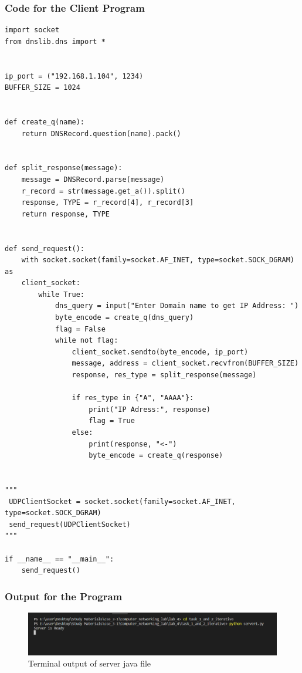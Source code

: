 \documentclass[11pt]{article}
\begin{document}
\subsubsection{Code for the Client Program}

\begin{verbatim}
import socket
from dnslib.dns import *


ip_port = ("192.168.1.104", 1234)
BUFFER_SIZE = 1024


def create_q(name):
    return DNSRecord.question(name).pack()


def split_response(message):
    message = DNSRecord.parse(message)
    r_record = str(message.get_a()).split()
    response, TYPE = r_record[4], r_record[3]
    return response, TYPE


def send_request():
    with socket.socket(family=socket.AF_INET, type=socket.SOCK_DGRAM) as 
    client_socket:
        while True:
            dns_query = input("Enter Domain name to get IP Address: ")
            byte_encode = create_q(dns_query)
            flag = False
            while not flag:
                client_socket.sendto(byte_encode, ip_port)
                message, address = client_socket.recvfrom(BUFFER_SIZE)
                response, res_type = split_response(message)

                if res_type in {"A", "AAAA"}:
                    print("IP Adress:", response)
                    flag = True
                else:
                    print(response, "<-")
                    byte_encode = create_q(response)


"""
 UDPClientSocket = socket.socket(family=socket.AF_INET, type=socket.SOCK_DGRAM)
 send_request(UDPClientSocket)
"""

if __name__ == "__main__":
    send_request()
\end{verbatim}

\subsubsection{Output for the Program}

  \begin{figure}[!h]
\centering
\includegraphics[width=\textwidth]{server1.png}
\caption{Terminal output of server java file }
\end{figure}
\end{document}
